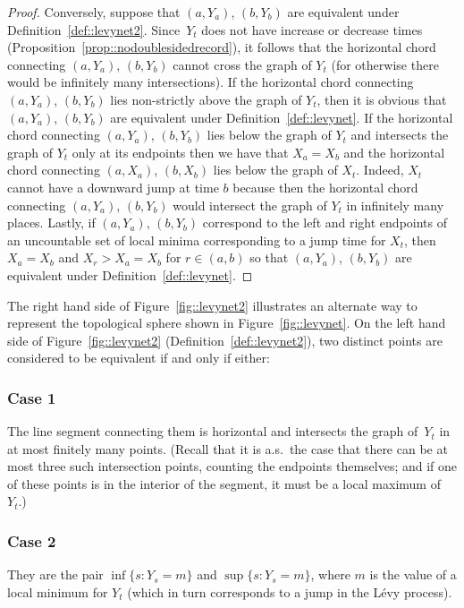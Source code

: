 \documentclass[10pt]{amsart}
\theoremstyle{plain}
\numberwithin{theorem}{section}
\theoremstyle{definition}
\begin{document}
\begin{proof}
Conversely, suppose that $(a,Y_a)$, $(b,Y_b)$ are equivalent under Definition~\ref{def::levynet2}. Since~$Y_t$ does not have increase or decrease times (Proposition~\ref{prop::nodoublesidedrecord}), it follows that the horizontal chord connecting $(a,Y_a)$, $(b,Y_b)$ cannot cross the graph of $Y_t$ (for otherwise there would be infinitely many intersections). If the horizontal chord connecting $(a,Y_a)$, $(b,Y_b)$ lies non-strictly above the graph of $Y_t$, then it is obvious that $(a,Y_a)$, $(b,Y_b)$ are equivalent under Definition~\ref{def::levynet}. If the horizontal chord connecting $(a,Y_a)$, $(b,Y_b)$ lies below the graph of $Y_t$ and intersects the graph of $Y_t$ only at its endpoints then we have that $X_a = X_b$ and the horizontal chord connecting $(a,X_a)$, $(b,X_b)$ lies below the graph of $X_t$. Indeed, $X_t$ cannot have a downward jump at time $b$ because then the horizontal chord connecting $(a,Y_a)$, $(b,Y_b)$ would intersect the graph of $Y_t$ in infinitely many places. Lastly, if $(a,Y_a)$, $(b,Y_b)$ correspond to the left and right endpoints of an uncountable set of local minima corresponding to a jump time for $X_t$, then $X_a = X_b$ and $X_r > X_a = X_b$ for $r \in (a,b)$ so that $(a,Y_a)$, $(b,Y_b)$ are equivalent under Definition~\ref{def::levynet}.
\end{proof}

The right hand side of Figure~\ref{fig::levynet2} illustrates an alternate way to represent the topological sphere shown in Figure~\ref{fig::levynet}. On the left hand side of Figure~\ref{fig::levynet2} (\ie Definition~\ref{def::levynet2}), two distinct points are considered to be equivalent if and only if either:

\subsubsection*{Case 1}
The line segment connecting them is horizontal and intersects the graph of~$Y_t$ in at most finitely many points. (Recall that it is a.s.\ the case that there can be at most three such intersection points, counting the endpoints themselves; and if one of these points is in the interior of the segment, it must be a local maximum of~$Y_t$.)

\subsubsection*{Case 2}
They are the pair $\inf\{s : Y_s = m\}$ and $\sup\{s : Y_s = m\}$, where $m$ is the value of a local minimum for $Y_t$ (which in turn corresponds to a jump in the Lévy process).
\end{document}
